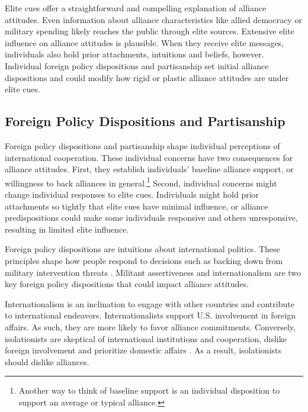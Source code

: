 \documentclass[12pt]{article}
\begin{document}
Elite cues offer a straightforward and compelling explanation of alliance attitudes.
Even information about alliance characteristics like allied democracy or military spending likely reaches the public through elite sources. 
Extensive elite influence on alliance attitudes is plausible. 
When they receive elite messages, individuals also hold prior attachments, intuitions and beliefs, however.
Individual foreign policy dispositions and partisanship set initial alliance dispositions and could modify how rigid or plastic alliance attitudes are under elite cues. 


\subsection{Foreign Policy Dispositions and Partisanship}


Foreign policy dispositions and partisanship shape individual perceptions of international cooperation. 
These individual concerns have two consequences for alliance attitudes. 
First, they establish individuals' baseline alliance support, or willingness to back alliances in general.\footnote{Another way to think of baseline support is an individual disposition to support an average or typical alliance.} 
Second, individual concerns might change individual responses to elite cues. 
Individuals might hold prior attachments so tightly that elite cues have minimal influence, or alliance predispositions could make some individuals responsive and others unresponsive, resulting in limited elite influence.



Foreign policy dispositions are intuitions about international politics. 
These principles shape how people respond to decisions such as backing down from military intervention threats \citep{KertzerBrutger2016}. 
Militant assertiveness and internationalism are two key foreign policy dispositions \citep{Herrmannetal1999} that could impact alliance attitudes. 


Internationalism is an inclination to engage with other countries and contribute to international endeavors. 
Internationalists support U.S. involvement in foreign affairs.
As such, they are more likely to favor alliance commitments. 
Conversely, isolationists are skeptical of international institutions and cooperation, dislike foreign involvement and prioritize domestic affairs \citep{Kertzer2013}. 
As a result, isolationists should dislike alliances.  
\end{document}
